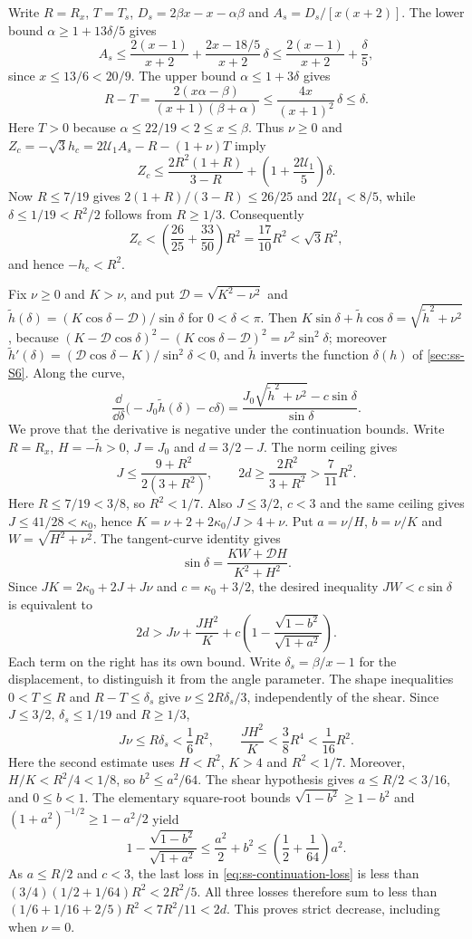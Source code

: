  Write $R=R_x$, $T=T_s$, $D_s=2\beta x-x-\alpha\beta$ and
$A_s=D_s/[x(x+2)]$. The lower bound $\alpha\ge1+13\delta/5$ gives
\[
 A_s\le\frac{2(x-1)}{x+2}+\frac{2x-18/5}{x+2}\,\delta
 \le\frac{2(x-1)}{x+2}+\frac\delta5,
\]
since $x\le13/6<20/9$. The upper bound $\alpha\le1+3\delta$ gives
\[
 R-T=\frac{2(x\alpha-\beta)}{(x+1)(\beta+\alpha)}
 \le\frac{4x}{(x+1)^2}\,\delta\le\delta.
\]
Here $T>0$ because $\alpha\le22/19<2\le x\le\beta$. Thus $\nu\ge0$ and
$Z_c=-\sqrt3h_c=2\mathcal U_1A_s-R-(1+\nu)T$ imply
\[
 Z_c\le\frac{2R^2(1+R)}{3-R}
          +\left(1+\frac{2\mathcal U_1}{5}\right)\delta.
\]
Now $R\le7/19$ gives $2(1+R)/(3-R)\le26/25$ and $2\mathcal U_1<8/5$, while
$\delta\le1/19<R^2/2$ follows from $R\ge1/3$. Consequently
\[
 Z_c<\left(\frac{26}{25}+\frac{33}{50}\right)R^2
 =\frac{17}{10}R^2<\sqrt3R^2,
\]
and hence $-h_c<R^2$.

 Fix $\nu\ge0$ and $K>\nu$, and put $\mathcal D=\sqrt{K^2-\nu^2}$ and
$\tilde h(\delta)=(K\cos\delta-\mathcal D)/\sin\delta$ for $0<\delta<\pi$. Then
$K\sin\delta+\tilde h\cos\delta=\sqrt{\tilde h^2+\nu^2}$, because
$(K-\mathcal D\cos\delta)^2-(K\cos\delta-\mathcal D)^2=\nu^2\sin^2\delta$; moreover
$\tilde h'(\delta)=(\mathcal D\cos\delta-K)/\sin^2\delta<0$, and $\tilde h$ inverts the function
$\delta(h)$ of \cref{sec:ss-S6}. Along the curve,
\[
  \frac{\dd}{\dd\delta}\bigl(-J_0\tilde h(\delta)-c\delta\bigr)
  =\frac{J_0\sqrt{\tilde h^2+\nu^2}-c\sin\delta}{\sin\delta}.
\]
We prove that the derivative is negative under the continuation bounds. Write $R=R_x$,
$H=-\tilde h>0$, $J=J_0$ and $d=3/2-J$. The norm ceiling gives
\[
 J\le\frac{9+R^2}{2(3+R^2)},\qquad
 2d\ge\frac{2R^2}{3+R^2}>\frac7{11}R^2.
\]
Here $R\le7/19<3/8$, so $R^2<1/7$. Also $J\le3/2$, $c<3$ and
the same ceiling gives $J\le41/28<\kappa_0$, hence $K=\nu+2+2\kappa_0/J>4+\nu$.
Put $a=\nu/H$, $b=\nu/K$ and $W=\sqrt{H^2+\nu^2}$. The tangent-curve identity gives
\[
 \sin\delta=\frac{KW+\mathcal D H}{K^2+H^2}.
\]
Since $JK=2\kappa_0+2J+J\nu$ and $c=\kappa_0+3/2$, the desired inequality
$JW<c\sin\delta$ is equivalent to
\begin{equation}\label{eq:ss-continuation-loss}
 2d>J\nu+\frac{JH^2}{K}
 +c\left(1-\frac{\sqrt{1-b^2}}{\sqrt{1+a^2}}\right).
\end{equation}
Each term on the right has its own bound. Write $\delta_s=\beta/x-1$ for the displacement,
to distinguish it from the angle parameter. The shape inequalities $0<T\le R$ and
$R-T\le\delta_s$ give $\nu\le2R\delta_s/3$, independently of the shear.
Since $J\le3/2$, $\delta_s\le1/19$ and
$R\ge1/3$,
\[
 J\nu\le R\delta_s<\frac16R^2,\qquad
 \frac{JH^2}{K}<\frac38R^4<\frac1{16}R^2.
\]
Here the second estimate uses $H<R^2$, $K>4$ and $R^2<1/7$.
Moreover, $H/K<R^2/4<1/8$, so $b^2\le a^2/64$.
The shear hypothesis gives $a\le R/2<3/16$, and $0\le b<1$.
The elementary square-root bounds
$\sqrt{1-b^2}\ge1-b^2$ and $(1+a^2)^{-1/2}\ge1-a^2/2$ yield
\[
 1-\frac{\sqrt{1-b^2}}{\sqrt{1+a^2}}
 \le\frac{a^2}{2}+b^2\le\left(\frac12+\frac1{64}\right)a^2.
\]
As $a\le R/2$ and $c<3$, the last loss in \eqref{eq:ss-continuation-loss} is less than
$(3/4)(1/2+1/64)R^2<2R^2/5$. All three losses therefore sum to less than
$(1/6+1/16+2/5)R^2<7R^2/11<2d$. This proves strict decrease, including when $\nu=0$.

